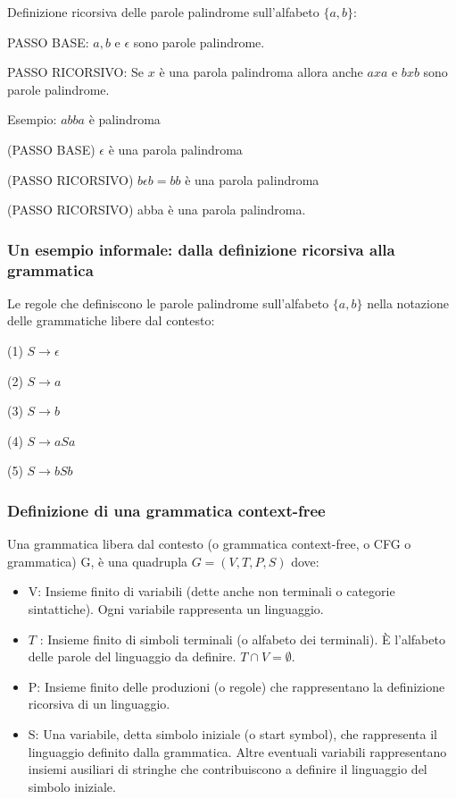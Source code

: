 Definizione ricorsiva delle parole palindrome sull'alfabeto $\{a, b\}:$

PASSO BASE: $a, b$ e $\epsilon$ sono parole palindrome.

PASSO RICORSIVO: Se $x$ è una parola palindroma allora anche $a x a$ e $b x b$ sono parole palindrome.

Esempio: $a b b a$ è palindroma

\vspace{5mm}

(PASSO BASE) $\epsilon$ è una parola palindroma

(PASSO RICORSIVO) $b \epsilon b=b b$ è una parola palindroma

(PASSO RICORSIVO) abba è una parola palindroma.

\subsubsection{Un esempio informale: dalla definizione ricorsiva alla grammatica}
Le regole che definiscono le parole palindrome sull'alfabeto $\{a, b\}$ nella notazione delle grammatiche libere dal contesto:

(1) $S \rightarrow \epsilon$

(2) $S \rightarrow a$

(3) $S \rightarrow b$

(4) $S \rightarrow a S a$

(5) $S \rightarrow b S b$

\subsubsection{Definizione di una grammatica context-free}

Una grammatica libera dal contesto (o grammatica context-free, o CFG o grammatica) G, è una quadrupla
$G=(V, T, P, S)$
dove:
\begin{itemize}
    \item V: Insieme finito di variabili (dette anche non terminali o categorie sintattiche). Ogni variabile rappresenta un linguaggio.
    \item $T$ : Insieme finito di simboli terminali (o alfabeto dei terminali). È l'alfabeto delle parole del linguaggio da definire. $T \cap V=\emptyset$.
    \item P: Insieme finito delle produzioni (o regole) che rappresentano la definizione ricorsiva di un linguaggio.
    \item S: Una variabile, detta simbolo iniziale (o start symbol), che rappresenta il linguaggio definito dalla grammatica. Altre eventuali variabili rappresentano insiemi ausiliari di stringhe che contribuiscono a definire il linguaggio del simbolo iniziale.
\end{itemize}

